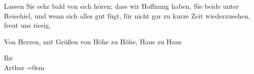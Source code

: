 \pstart
           Lassen Sie sehr bald von sich hören; dass wir Hoffnung haben, Sie beide unter
                  Reisehi{\geminationm}el, und wenn sich alles gut fügt, für nicht
               gar zu kurze Zeit wiederzusehen, freut uns riesig.\pend
           
\pstart
           Von Herzen, mit Grüßen von Höhe zu Höhe, Haus zu Haus\pend
           
\pstart
           Ihr{\\[\baselineskip]}\spacefill\mbox{Arthur}\pend
           \leftskip=0em{}\endnumbering{}  \newcommand{\dateiname}{L01695}\newcommand{\titel}{Arthur Schnitzler an Richard Beer-Hofmann, 29. 7. 1907}\newcommand{\editorInnen}{Martin Anton Müller und Gerd-Hermann Susen}
